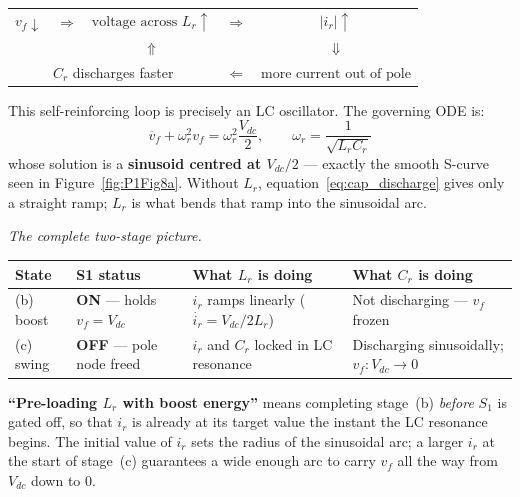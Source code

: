 \documentclass[12pt, a4paper]{article}
\def\,{ }%
\newcommand{\Vdc}{V_{dc}}
\newcommand{\vf}{v_f}
\newcommand{\ir}{i_r}
\newcommand{\Lr}{L_r}
\newcommand{\omegar}{\omega_r}
\newcommand{\figref}[1]{Figure~\ref{#1}}
\begin{document}
\begin{center}
\renewcommand{\arraystretch}{1.2}
\begin{tabular}{ccccc}
$\vf\!\downarrow$ & $\Rightarrow$ &
$\text{voltage across }\Lr\!\uparrow$ & $\Rightarrow$ &
$|\ir|\!\uparrow$ \\[2pt]
& & $\Uparrow$ & & $\Downarrow$ \\[2pt]
\multicolumn{3}{c}{$C_r$ discharges faster} & $\Leftarrow$ &
$\text{more current out of pole}$
\end{tabular}
\end{center}

This self-reinforcing loop is precisely an LC oscillator.
The governing ODE is:
\begin{equation}
    \ddot{\vf} + \omegar^2\,\vf = \omegar^2\,\frac{\Vdc}{2},
    \qquad \omegar = \frac{1}{\sqrt{\Lr C_r}}
    \label{eq:swing_ode_fig8}
\end{equation}
whose solution is a \textbf{sinusoid centred at $\Vdc/2$} --- exactly
the smooth S-curve seen in \figref{fig:P1Fig8a}.
Without $\Lr$, equation~\eqref{eq:cap_discharge} gives only a straight
ramp; $\Lr$ is what bends that ramp into the sinusoidal arc.

\medskip
\textit{The complete two-stage picture.}

\begin{center}
\renewcommand{\arraystretch}{1.3}
\begin{tabular}{p{1.8cm} p{2.8cm} p{3.8cm} p{3.8cm}}
\toprule
\textbf{State} & \textbf{S1 status} & \textbf{What $\Lr$ is doing} &
\textbf{What $C_r$ is doing} \\
\midrule
(b) boost & \textbf{ON} --- holds $\vf=\Vdc$ &
  $\ir$ ramps linearly ($\dot{\ir}=\Vdc/2\Lr$) &
  Not discharging --- $\vf$ frozen \\
(c) swing  & \textbf{OFF} --- pole node freed &
  $\ir$ and $C_r$ locked in LC resonance &
  Discharging sinusoidally; $\vf: \Vdc \to 0$ \\
\bottomrule
\end{tabular}
\end{center}

\textbf{``Pre-loading $\Lr$ with boost energy''} means completing
stage~(b) \emph{before} $S_1$ is gated off, so that $\ir$ is already at
its target value the instant the LC resonance begins.
The initial value of $\ir$ sets the radius of the sinusoidal arc;
a larger $\ir$ at the start of stage~(c) guarantees a wide enough arc
to carry $\vf$ all the way from $\Vdc$ down to 0.
\end{document}
